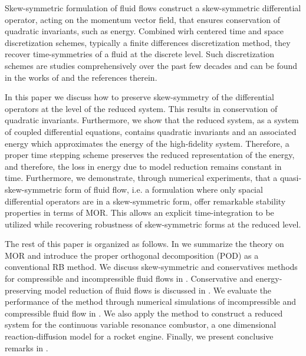 Skew-symmetric formulation of fluid flows construct a skew-symmetric differential operator, acting on the momentum vector field, that ensures conservation of quadratic invariants, such as energy. Combined wirh centered time and space discretization schemes, typically a finite differences discretization method, they recover time-symmetries of a fluid at the discrete level. Such discretization schemes are studies comprehensively over the past few decades and can be found in the works of \cite{morinishi2010skew,morinishi1998fully,desjardins2008high,tadmor1984skew,reiss2014conservative,reiss2014conservative} and the references therein.

In this paper we discuss how to preserve skew-symmetry of the differential operators at the level of the reduced system. This results in conservation of quadratic invariants. Furthermore, we show that the reduced system, as a system of coupled differential equations, contains quadratic invariants and an associated energy which approximates the energy of the high-fidelity system. Therefore, a proper time stepping scheme preserves the reduced representation of the energy, and therefore, the loss in energy due to model reduction remains constant in time. Furthermore, we demonstrate, through numerical experiments, that a quasi-skew-symmetric form of fluid flow, i.e. a formulation where only spacial differential operators are in a skew-symmetric form, offer remarkable stability properties in terms of MOR. This allows an explicit time-integration to be utilized while recovering robustness of skew-symmetric forms at the reduced level.

The rest of this paper is organized as follows. In  we summarize the theory on MOR and introduce the proper orthogonal decomposition (POD) as a conventional RB method. We discuss skew-symmetric and conservatives methods for compressible and incompressible fluid flows in . Conservative and energy-preserving model reduction of fluid flows is discussed in . We evaluate the performance of the method through numerical simulations of incompressible and compressible fluid flow in . We also apply the method to construct a reduced system for the continuous variable resonance combustor, a one dimensional reaction-diffusion model for a rocket engine. Finally, we present conclusive remarks in .

